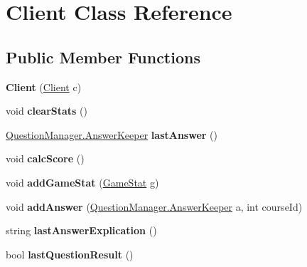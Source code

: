\hypertarget{class_client}{\section{Client Class Reference}
\label{class_client}
}
\subsection*{Public Member Functions}
\begin{DoxyCompactItemize}
\item 
\hypertarget{class_client_a2bc1aeeef442854ee4bdbd0e6d23f5c6}{{\bfseries Client} (\hyperlink{class_client}{Client} c)}\label{class_client_a2bc1aeeef442854ee4bdbd0e6d23f5c6}

\item 
\hypertarget{class_client_adf0ec085af92542f8eba232445d4e886}{void {\bfseries clear\-Stats} ()}\label{class_client_adf0ec085af92542f8eba232445d4e886}

\item 
\hypertarget{class_client_a9553c844c64a6309d31b142c2cd89c6b}{\hyperlink{class_question_manager_1_1_answer_keeper}{Question\-Manager.\-Answer\-Keeper} {\bfseries last\-Answer} ()}\label{class_client_a9553c844c64a6309d31b142c2cd89c6b}

\item 
\hypertarget{class_client_a228ca584f04ceffa5dc2f2c05d6c31bd}{void {\bfseries calc\-Score} ()}\label{class_client_a228ca584f04ceffa5dc2f2c05d6c31bd}

\item 
\hypertarget{class_client_a29380951461542f29caca2bc3accf9b2}{void {\bfseries add\-Game\-Stat} (\hyperlink{class_game_stat}{Game\-Stat} g)}\label{class_client_a29380951461542f29caca2bc3accf9b2}

\item 
\hypertarget{class_client_acc3c6e096782855439359c0f91ee05d3}{void {\bfseries add\-Answer} (\hyperlink{class_question_manager_1_1_answer_keeper}{Question\-Manager.\-Answer\-Keeper} a, int course\-Id)}\label{class_client_acc3c6e096782855439359c0f91ee05d3}

\item 
\hypertarget{class_client_a7609e20cfc591a8da8e61a0d2187dc4c}{string {\bfseries last\-Answer\-Explication} ()}\label{class_client_a7609e20cfc591a8da8e61a0d2187dc4c}

\item 
\hypertarget{class_client_a5f51c147af3149d4a5112575358be5ea}{bool {\bfseries last\-Question\-Result} ()}\label{class_client_a5f51c147af3149d4a5112575358be5ea}


\end{DoxyCompactItemize}
